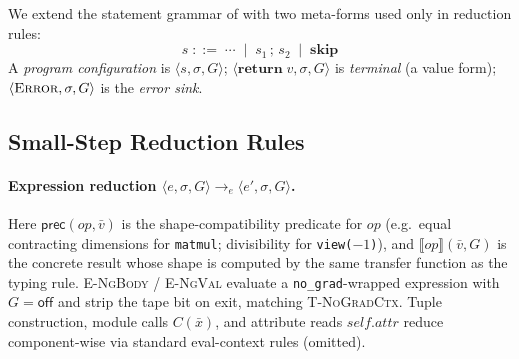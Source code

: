 We extend the statement grammar of  with two meta-forms used
only in reduction rules:
\[
 s \;::=\; \cdots \;\mid\; s_1\,;\,s_2 \;\mid\; \mathbf{skip}
\]
A \emph{program configuration} is $\langle s,\sigma,G\rangle$;
$\langle\mathbf{return}\;v,\sigma,G\rangle$ is \emph{terminal}
(a value form); $\langle\textsc{Error},\sigma,G\rangle$ is the
\emph{error sink}.

\subsection{Small-Step Reduction Rules}
\label{app:sos-rules}

\paragraph{Expression reduction
 $\langle e,\sigma,G\rangle\to_e\langle e',\sigma,G\rangle$.}

{\small
{}}

\noindent
Here $\mathsf{prec}(\mathit{op},\bar v)$ is the shape-compatibility predicate
for $\mathit{op}$ (e.g.\ equal contracting dimensions for \texttt{matmul};
divisibility for \texttt{view($-1$)}), and $\llbracket\mathit{op}\rrbracket(\bar v,G)$
is the concrete result whose shape is computed by the same transfer function as
the typing rule.
\textsc{E-NgBody} / \textsc{E-NgVal} evaluate a \texttt{no\_grad}-wrapped
expression with $G=\mathsf{off}$ and strip the tape bit on exit, matching
\textsc{T-NoGradCtx}.
Tuple construction, module calls $C(\bar x)$, and attribute reads
$\mathit{self}.\mathit{attr}$ reduce component-wise via standard eval-context
rules (omitted).

